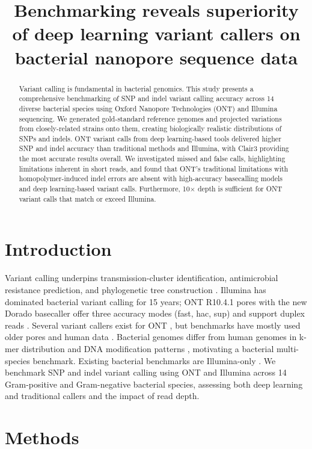 \documentclass[11pt]{article}
\title{Benchmarking reveals superiority of deep learning variant callers on bacterial nanopore sequence data}
\author{}
\date{}
\begin{document}
\maketitle

\begin{abstract}
Variant calling is fundamental in bacterial genomics. This study presents a comprehensive benchmarking of SNP and indel variant calling accuracy across 14 diverse bacterial species using Oxford Nanopore Technologies (ONT) and Illumina sequencing. We generated gold-standard reference genomes and projected variations from closely-related strains onto them, creating biologically realistic distributions of SNPs and indels. ONT variant calls from deep learning-based tools delivered higher SNP and indel accuracy than traditional methods and Illumina, with Clair3 providing the most accurate results overall. We investigated missed and false calls, highlighting limitations inherent in short reads, and found that ONT's traditional limitations with homopolymer-induced indel errors are absent with high-accuracy basecalling models and deep learning-based variant calls. Furthermore, 10$\times$ depth is sufficient for ONT variant calls that match or exceed Illumina.
\end{abstract}

\section{Introduction}
Variant calling underpins transmission-cluster identification, antimicrobial resistance prediction, and phylogenetic tree construction \citep{r1,r2,r3,r4,r5,r6}. Illumina has dominated bacterial variant calling for 15 years; ONT R10.4.1 pores with the new Dorado basecaller offer three accuracy modes (fast, hac, sup) and support duplex reads \citep{r10,r11,r12,r13}. Several variant callers exist for ONT \citep{r14,r15,r16,r20}, but benchmarks have mostly used older pores and human data \citep{r17,r18,r19}. Bacterial genomes differ from human genomes in k-mer distribution and DNA modification patterns \citep{r21}, motivating a bacterial multi-species benchmark. Existing bacterial benchmarks are Illumina-only \citep{r22,r23}. We benchmark SNP and indel variant calling using ONT and Illumina across 14 Gram-positive and Gram-negative bacterial species, assessing both deep learning and traditional callers and the impact of read depth.

\section{Methods}
\end{document}
